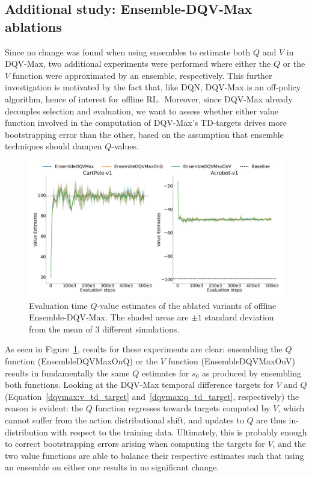 \subsection{Additional study: Ensemble-DQV-Max ablations}
Since no change was found when using ensembles to estimate both $Q$
and $V$ in DQV-Max, two additional experiments were performed where
either the $Q$ or the $V$ function were approximated by an ensemble,
respectively. This further investigation is motivated by the fact
that, like DQN, DQV-Max is an off-policy algorithm, hence of interest
for offline RL.\ Moreover, since DQV-Max already decouples selection
and evaluation, we want to assess whether either value function
involved in the computation of DQV-Max's TD-targets drives more
bootstrapping error than the other, based on the assumption that
ensemble techniques should dampen $Q$-values.
\begin{figure}[h]
  \centering
  \includegraphics[width=.9\textwidth]{img/dshift_plots_ablation_qv.png}
  \caption{Evaluation time $Q$-value estimates of the ablated variants
    of offline Ensemble-DQV-Max. The shaded areas are $\pm 1$ standard
    deviation from the mean of 3 different
    simulations.}\label{fig:dshift_dqvmax_ablations}
\end{figure}
As seen in Figure~\ref{fig:dshift_dqvmax_ablations}, results for these
experiments are clear: ensembling the $Q$ function
(EnsembleDQVMaxOnQ) or the $V$ function (EnsembleDQVMaxOnV) results in
fundamentally the same $Q$ estimates for $s_0$ as produced by
ensembling both functions. Looking at the DQV-Max temporal difference
targets for $V$ and $Q$ (Equation~\ref{dqvmax:v_td_target}
and~\ref{dqvmax:q_td_target}, respectively) the reason is evident: the
$Q$ function regresses towards targets computed by $V$, which cannot
suffer from the action distributional shift, and updates to $Q$ are
thus in-distribution with respect to the training data. Ultimately,
this is probably enough to correct bootstrapping errors arising when
computing the targets for $V$, and the two value functions are able to
balance their respective estimates such that using an ensemble on
either one results in no significant change.
